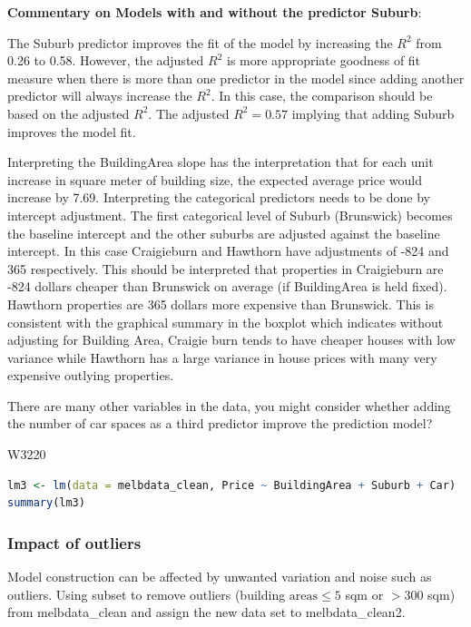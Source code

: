 \noindent \textbf{Commentary on Models with and without the predictor Suburb}:

The Suburb predictor improves the fit of the model by increasing the $R^2$ from 0.26 to 0.58. However, the adjusted $R^2$ is more appropriate goodness of fit measure when there is more than one predictor in the model since adding another predictor will always increase the $R^2$. In this case, the comparison should be based on the adjusted $R^2$. The adjusted $R^2= 0.57$  implying that adding Suburb improves the model fit.

Interpreting the BuildingArea slope has the interpretation that for each unit increase in square meter of building size, the expected average price would increase by 7.69. Interpreting the categorical predictors needs to be done by intercept adjustment. The first categorical level of Suburb (Brunswick) becomes the baseline intercept and the other suburbs are adjusted against the baseline intercept. In this case Craigieburn and Hawthorn have adjustments of -824 and 365 respectively. This should be interpreted that properties in Craigieburn are -824 dollars cheaper than Brunswick on average (if BuildingArea is held fixed). Hawthorn properties are 365 dollars more expensive than Brunswick. This is consistent with the graphical summary in the boxplot which indicates without adjusting for Building Area, Craigie burn tends to have cheaper houses with low variance while Hawthorn has a large variance in house prices with many very expensive outlying properties.

\bigskip

There are many other variables in the data, you might consider whether adding the number of car spaces as a third predictor improve the prediction model?


\begin{ocg}{}{W322}{0}
\begin{lstlisting}[language = R]
lm3 <- lm(data = melbdata_clean, Price ~ BuildingArea + Suburb + Car)
summary(lm3)
\end{lstlisting}
\end{ocg}

\subsubsection{Impact of outliers}

\indent 

Model construction can be affected by unwanted variation and noise such as outliers. Using subset to remove outliers (building $\text{areas} \leq 5$ sqm or $> 300$ sqm) from melbdata\_clean and assign the new data set to melbdata\_clean2.

